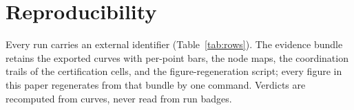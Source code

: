 \documentclass[11pt,a4paper]{article}
\begin{document}
\section*{Reproducibility}

Every run carries an external identifier (Table~\ref{tab:rows}). The
evidence bundle retains the exported curves with per-point bars, the
node maps, the coordination trails of the certification cells, and the
figure-regeneration script; every figure in this paper regenerates
from that bundle by one command. Verdicts are recomputed from curves,
never read from run badges.



\end{document}
